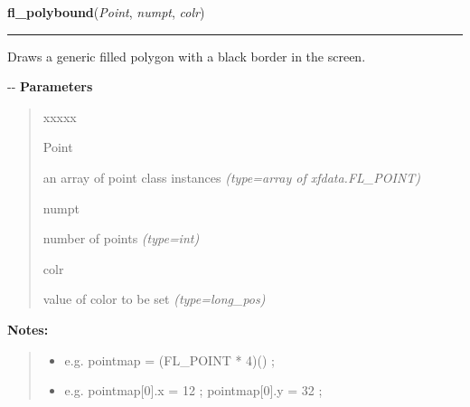     \label{xformslib:flxbasic:fl_polybound}

    \vspace{0.5ex}

\hspace{.8\funcindent}\begin{boxedminipage}{\funcwidth}

    \raggedright \textbf{fl\_polybound}(\textit{Point}, \textit{numpt}, \textit{colr})

    \vspace{-1.5ex}

    \rule{\textwidth}{0.5\fboxrule}
\setlength{\parskip}{2ex}

Draws a generic filled polygon with a black border in the screen.

-{}-
\setlength{\parskip}{1ex}
      \textbf{Parameters}
      \vspace{-1ex}

      \begin{quote}
        \begin{Ventry}{xxxxx}

          \item[Point]


an array of point class instances
            {\it (type=array of xfdata.FL\_POINT)}

          \item[numpt]


number of points
            {\it (type=int)}

          \item[colr]


value of color to be set
            {\it (type=long\_pos)}

        \end{Ventry}

      \end{quote}

\textbf{Notes:}
\begin{quote}
  \begin{itemize}

  \item
    \setlength{\parskip}{0.6ex}

e.g. pointmap = (FL\_POINT * 4)() ;


  \item 
e.g. pointmap{[}0{]}.x = 12 ; pointmap{[}0{]}.y = 32 ;



\end{itemize}
\end{quote}
\end{boxedminipage}
